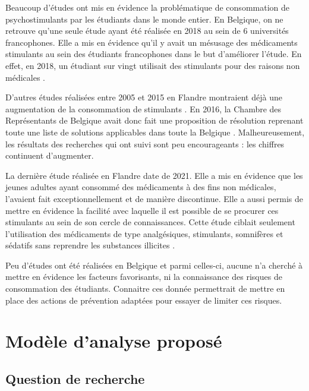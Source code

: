 Beaucoup d'études ont mis en évidence la problématique de consommation de psychostimulants par les étudiants dans le monde entier.
En Belgique, on ne retrouve qu'une seule étude ayant été réalisée en 2018 au sein de 6 universités francophones. Elle a mis en évidence qu'il y avait un mésusage des médicaments stimulants au sein des étudiants francophones dans le but d'améliorer l'étude. En effet, en 2018, un étudiant sur vingt utilisait des stimulants pour des raisons non médicales \parencite{sabbe_use_2022}. \newline

D'autres études réalisées entre 2005 et 2015 en Flandre montraient déjà une augmentation de la consommation de stimulants \parencite{van_wel_changes_2016}.
En 2016, la Chambre des Représentants de Belgique avait donc fait une proposition de résolution reprenant toute une liste de solutions applicables dans toute la Belgique \parencite{noauthor_proposition_2016}.
Malheureusement, les résultats des recherches qui ont suivi sont peu encourageants : les chiffres continuent d'augmenter. \newline

La dernière étude réalisée en Flandre date de 2021. Elle a mis en évidence que les jeunes adultes ayant consommé des médicaments à des fins non médicales, l'avaient fait exceptionnellement et de manière discontinue. Elle a aussi permis de mettre en évidence la facilité avec laquelle il est possible de se procurer ces stimulants au sein de son cercle de connaissances. Cette étude ciblait seulement l'utilisation des médicaments de type analgésiques, stimulants, somnifères et sédatifs sans reprendre les substances illicites \parencite{bawin_federal_nodate}. \newline

Peu d'études ont été réalisées en Belgique et parmi celles-ci, aucune n'a cherché à mettre en évidence les facteurs favorisants, ni la connaissance des risques de consommation des étudiants. Connaitre ces donnée permettrait de mettre en place des actions de prévention adaptées pour essayer de limiter ces risques.

\chapter{Modèle d'analyse proposé}
\section{Question de recherche}


